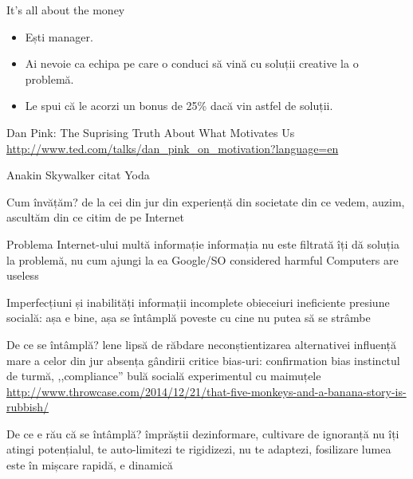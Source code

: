 \documentclass{beamer}
\begin{document}
\begin{frame}{It's all about the money}
  \begin{itemize}
    \item Ești manager.
    \item Ai nevoie ca echipa pe care o conduci să vină cu soluții creative la o problemă.
    \item Le spui că le acorzi un bonus de 25\% dacă vin astfel de soluții.
  \end{itemize}
  \begin{center}
    Dan Pink: The Suprising Truth About What Motivates Us\\
    \scriptsize
    \url{http://www.ted.com/talks/dan_pink_on_motivation?language=en}
  \end{center}
\end{frame}

\begin{frame}{Anakin Skywalker}
  citat Yoda
\end{frame}

\begin{frame}{Cum învățăm?}
  de la cei din jur
  din experiență
  din societate
  din ce vedem, auzim, ascultăm
  din ce citim
  de pe Internet
\end{frame}

\begin{frame}{Problema Internet-ului}
  multă informație
  informația nu este filtrată
  îți dă soluția la problemă, nu cum ajungi la ea
  Google/SO considered harmful
  Computers are useless
\end{frame}

\begin{frame}{Imperfecțiuni și inabilități}
  informații incomplete
  obieceiuri ineficiente
  presiune socială: așa e bine, așa se întâmplă
  poveste cu cine nu putea să se strâmbe
\end{frame}

\begin{frame}{De ce se întâmplă?}
  lene
  lipsă de răbdare
  neconștientizarea alternativei
  influență mare a celor din jur
  absența gândirii critice
  bias-uri: confirmation bias
  instinctul de turmă, ,,compliance''
  bulă socială
  experimentul cu maimuțele
  \url{http://www.throwcase.com/2014/12/21/that-five-monkeys-and-a-banana-story-is-rubbish/}
\end{frame}

\begin{frame}{De ce e rău că se întâmplă?}
  împrăștii dezinformare, cultivare de ignoranță
  nu îți atingi potențialul, te auto-limitezi
  te rigidizezi, nu te adaptezi, fosilizare
  lumea este în mișcare rapidă, e dinamică
\end{frame}
\end{document}
